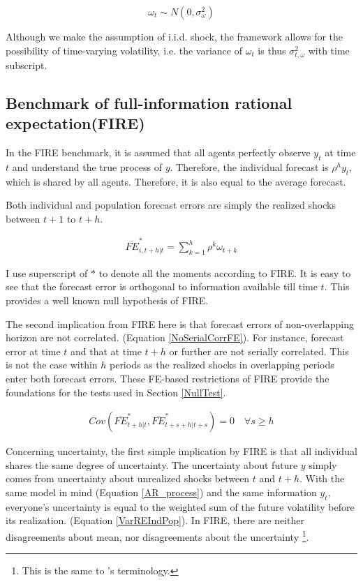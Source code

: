 \documentclass[12pt]{article}
\begin{document}
	$$\omega_t \sim N(0,\sigma^2_{\omega})$$
	
	Although we make the assumption of i.i.d. shock, the framework allows for the possibility of time-varying volatility, i.e. the variance of $\omega_t$ is thus $\sigma^2_{t,\omega}$ with time subscript. 
	
	\subsection{Benchmark of full-information rational expectation(FIRE)}
	
	In the FIRE benchmark,  it is assumed that all agents perfectly observe $y_t$ at time $t$ and understand the true process of $y$. Therefore, the individual forecast is $\rho^h y_t $, which is shared by all agents. Therefore, it is also equal to the average forecast. 
	
	Both individual and population forecast errors are simply the realized shocks between $t+1$ to $t+h$.  
	
	\begin{eqnarray}\label{NoPastInfFE}
		\overline{FE}^{*}_{i,t+h|t} = \sum^{h}_{k=1} \rho^k \omega_{t+k}
	\end{eqnarray}
	
	I use superscript of $*$ to denote all the moments according to FIRE. It is easy to see that the forecast error is orthogonal to information available till time $t$. This provides a well known null hypothesis of FIRE.
	
	The second implication from FIRE here is that forecast errors of non-overlapping horizon are not correlated. (Equation \ref{NoSerialCorrFE}). For instance, forecast error at time $t$ and that at time $t+h$ or further are not serially correlated. This is not the case within $h$ periods as the realized shocks in overlapping periods enter both forecast errors.  These FE-based restrictions of FIRE provide the foundations for the tests used in Section \ref{NullTest}. 
	
	\begin{eqnarray}\label{NoSerialCorrFE}
		Cov(\overline{FE}^{*}_{t+h|t}, \overline{FE}^{*}_{t+s+h|t+s}) = 0 \quad \forall s \geq h
	\end{eqnarray}
	
	Concerning uncertainty, the first simple implication by FIRE is that all individual shares the same degree of uncertainty. The uncertainty about future $y$ simply comes from uncertainty about unrealized shocks between $t$ and $t+h$. With the same model in mind (Equation \ref{AR_process}) and the same information $y_t$, everyone's uncertainty is equal to the weighted sum of the future volatility before its realization. (Equation \ref{VarREIndPop}). In FIRE, there are neither disagreements about mean, nor disagreements about the uncertainty \footnote{This is the same to \citet{jurado2015measuring}'s terminology.}. 
	
\end{document}
